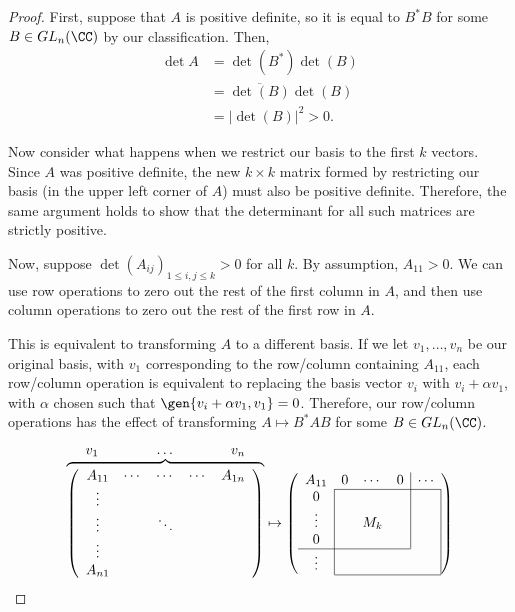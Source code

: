 \begin{proof}
First, suppose that $A$ is positive definite, so it is equal to $B^*B$ for some $B\in GL_n(\CC)$ by our classification. Then,
\begin{align*}
    \det A &= \det (B^*) \det (B) \\
    &= \overline{\det (B)}\det (B) \\
    &= \vert \det (B)\vert ^2 > 0.
\end{align*}

Now consider what happens when we restrict our basis to the first $k$ vectors. Since $A$ was positive definite, the new $k\times k$ matrix formed by restricting our basis (in the upper left corner of $A$) must also be positive definite. Therefore, the same argument holds to show that the determinant for all such matrices are strictly positive. 

Now, suppose $\det (A_{ij})_{1\leq i,j\leq k} >0$ for all $k$. By assumption, $A_{11} > 0$. We can use row operations to zero out the rest of the first column in $A$, and then use column operations to zero out the rest of the first row in $A$. 

This is equivalent to transforming $A$ to a different basis. If we let $v_1, \hdots, v_n$ be our original basis, with $v_1$ corresponding to the row/column containing $A_{11}$, each row/column operation is equivalent to replacing the basis vector $v_i$ with $v_i+\alpha v_1$, with $\alpha$ chosen such that $\gen{v_i+\alpha v_1, v_1} = 0$. Therefore, our row/column operations has the effect of transforming $A\mapsto B^*AB$ for some $B\in GL_n(\CC)$. 

\[\overbrace{\left(
    \begin{array}{ccccc}
      A_{11} & \cdots &  \cdots &  \cdots & A_{1n} \\
      \vdots &&&&\\
      \vdots &&\ddots &&\\
      \vdots &&&&\\
      A_{n1} &&&&\\
    \end{array}
    \right)}^{\displaystyle v_1 \hspace{1.4cm} \hdots \hspace{1.4cm} v_n}
\mapsto
\left(
    \begin{array}{ccccc}
      A_{11} & 0 & \cdots & \multicolumn{1}{c|}{0} &\cdots \\
      \cline{2-5}
      \multicolumn{1}{c|}{0} &&&\multicolumn{1}{c|}{} &\multicolumn{1}{c|}{} \\
      \multicolumn{1}{c|}{\vdots} && M_k &\multicolumn{1}{c|}{} &\multicolumn{1}{c|}{} \\
      \multicolumn{1}{c|}{0} &&&\multicolumn{1}{c|}{} &\multicolumn{1}{c|}{}\\ \cline{1-4}
      \multicolumn{1}{c|}{\vdots} &&&& \multicolumn{1}{c|}{}\\
      \cline{2-5}
    \end{array}
    \right)\]


\end{proof}

